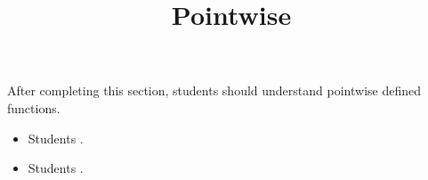 \documentclass{ximera}
\title{Pointwise}
\begin{document}
\begin{abstract}
\end{abstract}

\maketitle

\begin{sectionOutcomes}

After completing this section, students should understand pointwise defined functions. 

\begin{itemize}
\item Students .
\item Students .
\end{itemize}

\end{sectionOutcomes}
\end{document}
